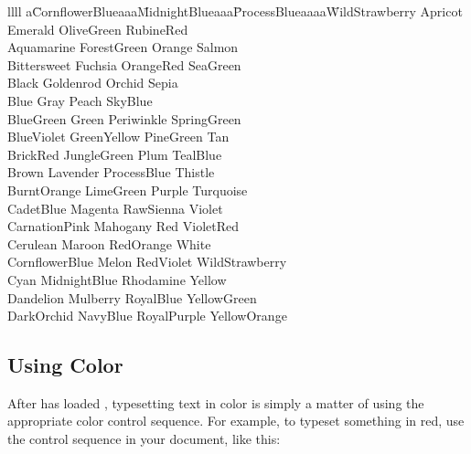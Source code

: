 \begin{tabbing}{llll}
a\=CornflowerBlueaaa\=MidnightBlueaaa\=ProcessBlueaaaa\=WildStrawberry \kill
 \>Apricot         \>Emerald       \>OliveGreen   \>RubineRed      \\
 \>Aquamarine      \>ForestGreen   \>Orange       \>Salmon         \\
 \>Bittersweet     \>Fuchsia       \>OrangeRed    \>SeaGreen       \\
 \>Black           \>Goldenrod     \>Orchid       \>Sepia          \\
 \>Blue            \>Gray          \>Peach        \>SkyBlue        \\
 \>BlueGreen       \>Green         \>Periwinkle   \>SpringGreen    \\
 \>BlueViolet      \>GreenYellow   \>PineGreen    \>Tan            \\
 \>BrickRed        \>JungleGreen   \>Plum         \>TealBlue       \\
 \>Brown           \>Lavender      \>ProcessBlue  \>Thistle        \\
 \>BurntOrange     \>LimeGreen     \>Purple       \>Turquoise      \\
 \>CadetBlue       \>Magenta       \>RawSienna    \>Violet         \\
 \>CarnationPink   \>Mahogany      \>Red          \>VioletRed      \\
 \>Cerulean        \>Maroon        \>RedOrange    \>White          \\
 \>CornflowerBlue  \>Melon         \>RedViolet    \>WildStrawberry \\
 \>Cyan            \>MidnightBlue  \>Rhodamine    \>Yellow         \\
 \>Dandelion       \>Mulberry      \>RoyalBlue    \>YellowGreen    \\
 \>DarkOrchid      \>NavyBlue      \>RoyalPurple  \>YellowOrange   \\
\end{tabbing}

\subsection{Using Color}

After  has loaded , typesetting text
in color is simply a matter of using the appropriate color control
sequence.  For example, to typeset something in red, use the 
 control sequence in your document, like this:

